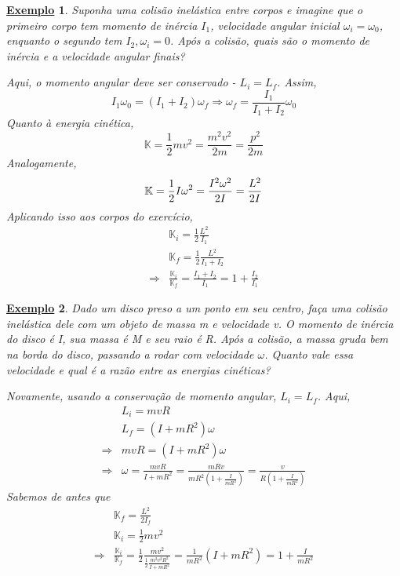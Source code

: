 \documentclass{article}
\newtheorem{example}{\underline{Exemplo}}
\begin{document}
 \begin{example}
   Suponha uma colisão inelástica entre corpos e imagine que o primeiro corpo tem momento de inércia \(I_{1}\), velocidade angular inicial \(\omega_i = \omega_{0}\),
   enquanto o segundo tem \(I_{2}, \omega _{i} = 0\). Após a colisão, quais são o momento de inércia e a velocidade angular finais?

 Aqui, o momento angular deve ser conservado - \(L_{i} = L_{f}\). Assim,
   \[
     I_{1}\omega_{0} = (I_{1}+I_{2})\omega_{f} \Rightarrow \omega_{f} = \frac{I_{1}}{I_{1}+I_{2}}\omega_{0}
   \]
 Quanto à energia cinética, 
   \[
     \mathbb{K} = \frac{1}{2}mv^{2} = \frac{m^{2}v^{2}}{2m} = \frac{p^{2}}{2m}
   \]
  Analogamente,
  \[
   \mathbb{K} = \frac{1}{2}I\omega^{2} = \frac{I^{2}\omega^{2}}{2I} = \frac{L^{2}}{2I}\\
  \]
  Aplicando isso aos corpos do exercício, 
 \begin{align*}
   &\mathbb{K}_{i} = \frac{1}{2}\frac{L^{2}}{I_{1}}\\
   &\mathbb{K}_{f} = \frac{1}{2}\frac{L^{2}}{I_{1}+I_{2}}\\
   \Rightarrow& \frac{\mathbb{K}_{i}}{\mathbb{K}_{f}} = \frac{I_{1}+I_{2}}{I_{1}} = 1 + \frac{I_{2}}{I_{1}}
 \end{align*}
\end{example}
\begin{example}
  Dado um disco preso a um ponto em seu centro, faça uma colisão inelástica dele com um objeto de massa m e velocidade v. O momento de inércia do disco é I, sua massa é M e seu raio é R.
Após a colisão, a massa gruda bem na borda do disco, passando a rodar com velocidade \(\omega \). Quanto vale essa velocidade e qual é a razão entre as energias cinéticas?

  Novamente, usando a conservação de momento angular, \(L_{i} = L_{f}\). Aqui, 
 \begin{align*}
   &L_{i} = mvR\\
   &L_{f} = (I+mR^{2})\omega\\
   \Rightarrow& mvR = (I+mR^{2})\omega\\
   \Rightarrow& \omega = \frac{mvR}{I+mR^{2}} = \frac{mRv}{mR^{2}(1+\frac{I}{mR^{2}})} = \frac{v}{R(1+\frac{I}{mR^{2}})}
 \end{align*}
  Sabemos de antes que 
 \begin{align*}
   &\mathbb{K}_{f}=\frac{L^{2}}{2I_{f}}\\
   &\mathbb{K}_{i} = \frac{1}{2}mv^{2}\\
   \Rightarrow& \frac{\mathbb{K}_{i}}{\mathbb{K}_{f}} = \frac{1}{2}\frac{mv^{2}}{\frac{1}{2}\frac{m^{2}v^{2}R^{2}}{I+mR^{2}}} = \frac{1}{mR^{2}}(I+mR^{2}) = 1 + \frac{I}{mR^{2}}
 \end{align*}
\end{example}
\end{document}
